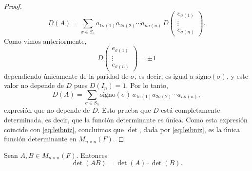 \documentclass[12pt,a4paper]{book}
\begin{document}
\begin{proof}
\begin{equation*}
            D(A) = \sum_{\sigma \in S_{n}} a_{1\sigma(1)} a_{2\sigma(2)} \cdots a_{n\sigma(n)} \, D
            \begin{pmatrix}
                e_{\sigma(1)} \\
                \vdots \\
                e_{\sigma(n)}
            \end{pmatrix}.
        \end{equation*}
        Como vimos anteriormente,
        \begin{equation*}
            D
            \begin{pmatrix}
                e_{\sigma(1)} \\
                \vdots \\
                e_{\sigma(n)}
            \end{pmatrix}
            = \pm 1
        \end{equation*}
        dependiendo únicamente de la paridad de $\sigma$, es decir, es igual a $\text{signo}(\sigma)$, y este valor no depende de $D$ pues $D(I_{n}) = 1$. Por lo tanto,
        \begin{equation*}
            D(A) = \sum_{\sigma \in S_{n}} \text{signo}(\sigma) \, a_{1\sigma(1)} a_{2\sigma(2)} \cdots a_{n\sigma(n)},
        \end{equation*}
        expresión que no depende de $D$. Esto prueba que $D$ está completamente determinada, es decir, que la función determinante es única. Como esta expresión coincide con \eqref{eq:leibniz}, concluimos que $\det$, dada por \eqref{eq:leibniz}, es la única función determinante en $M_{n \times n}(F)$.
    \end{proof}

    \begin{proposicion}
    \label{prop:39}
        Sean $A, B \in M_{n \times n}(F)$. Entonces
        \begin{equation*}
            \det(AB) = \det(A) \cdot \det(B).
        \end{equation*}
    \end{proposicion}
\end{document}
